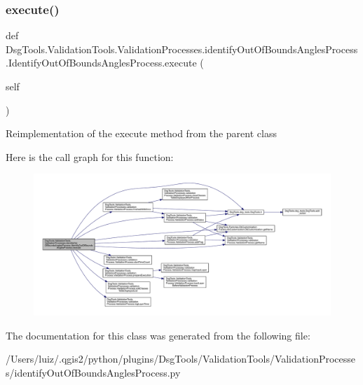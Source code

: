 \subsubsection{\texorpdfstring{execute()}{execute()}}
{\footnotesize\ttfamily def Dsg\+Tools.\+Validation\+Tools.\+Validation\+Processes.\+identify\+Out\+Of\+Bounds\+Angles\+Process.\+Identify\+Out\+Of\+Bounds\+Angles\+Process.\+execute (\begin{DoxyParamCaption}\item[{}]{self }\end{DoxyParamCaption})}

\begin{DoxyVerb}Reimplementation of the execute method from the parent class
\end{DoxyVerb}
 Here is the call graph for this function\+:
\nopagebreak
\begin{figure}[H]
\begin{center}
\leavevmode
\includegraphics[width=350pt]{class_dsg_tools_1_1_validation_tools_1_1_validation_processes_1_1identify_out_of_bounds_angles_p018c2eea3681ae6533cd0c1659513e7b_a4ac273d1fb6b14b7b2a25d9d27d38b46_cgraph}
\end{center}
\end{figure}


The documentation for this class was generated from the following file\+:\begin{DoxyCompactItemize}
\item 
/\+Users/luiz/.\+qgis2/python/plugins/\+Dsg\+Tools/\+Validation\+Tools/\+Validation\+Processes/identify\+Out\+Of\+Bounds\+Angles\+Process.\+py\end{DoxyCompactItemize}
